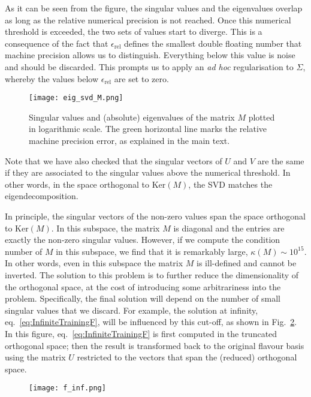 As it can be seen from the figure, the singular values and the eigenvalues
overlap as long as the relative numerical precision is not reached. Once this
numerical threshold is exceeded, the two sets of values start to diverge. This
is a consequence of the fact that $\epsilon_{\textrm{rel}}$ defines the smallest
double floating number that machine precision allows us to distinguish.
Everything below this value is noise and should be discarded. This prompts us to
apply an \textit{ad hoc} regularisation to $\Sigma$, whereby the values below
$\epsilon_{\textrm{rel}}$ are set to zero.
\begin{figure}[h]
  \centering
  \texttt{[image: eig\_svd\_M.png]}
  \caption{\small Singular values and (absolute) eigenvalues of the matrix $M$
    plotted in logarithmic scale. The green horizontal line marks the relative
    machine precision error, as explained in the main text.}
  \label{fig:eig_svd_M}
\end{figure}
Note that we have also checked that the singular vectors of $U$ and $V$ are the
same if they are associated to the singular values above the numerical
threshold. In other words, in the space orthogonal to Ker$(M)$, the SVD matches
the eigendecomposition.

In principle, the singular vectors of the non-zero values span the space
orthogonal to Ker$(M)$. In this subspace, the matrix $M$ is diagonal and the
entries are exactly the non-zero singular values. However, if we compute the
condition number of $M$ in this subspace, we find that it is remarkably large,
$\kappa(M) \sim 10^{15}$. In other words, even in this subspace the matrix $M$
is ill-defined and cannot be inverted. The solution to this problem is to
further reduce the dimensionality of the orthogonal space, at the cost of
introducing some arbitrariness into the problem. Specifically, the final
solution will depend on the number of small singular values that we discard. For
example, the solution at infinity, eq.~\eqref{eq:InfiniteTrainingF}, will be
influenced by this cut-off, as shown in Fig.~\ref{fig:InfiniteTrainingFCuts}. In
this figure, eq.~\eqref{eq:InfiniteTrainingF} is first computed in the truncated
orthogonal space; then the result is transformed back to the original flavour
basis using the matrix $U$ restricted to the vectors that span the (reduced)
orthogonal space.
\begin{figure}[h]
  \centering
  \texttt{[image: f\_inf.png]}
  \caption{\small}
  \label{fig:InfiniteTrainingFCuts}
\end{figure}

